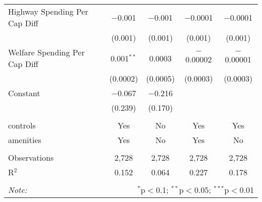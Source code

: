 \begin{table}[!htbp]
\begin{tabular}{@{\extracolsep{5pt}}lcccc}
  Highway Spending Per Cap Diff & $-$0.001 & $-$0.001 & $-$0.0001 & $-$0.0001 \\ 
  & (0.001) & (0.001) & (0.001) & (0.001) \\ 
  Welfare Spending Per Cap Diff & 0.001$^{**}$ & 0.0003 & $-$0.00002 & $-$0.00001 \\ 
  & (0.0002) & (0.0005) & (0.0003) & (0.0003) \\ 
  Constant & $-$0.067 & $-$0.216 &  &  \\ 
  & (0.239) & (0.170) &  &  \\ 
 \hline \\[-1.8ex] 
controls & Yes & No & Yes & Yes \\ 
amenities & Yes & No & Yes & No \\ 
\hline \\[-1.8ex] 
Observations & 2,728 & 2,728 & 2,728 & 2,728 \\ 
R$^{2}$ & 0.152 & 0.064 & 0.227 & 0.178 \\ 
\hline 
\hline \\[-1.8ex] 
\textit{Note:}  & \multicolumn{4}{r}{$^{*}$p$<$0.1; $^{**}$p$<$0.05; $^{***}$p$<$0.01} \\ 
\end{tabular} 
\end{table} 
